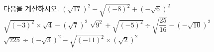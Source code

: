 다음을 계산하시오.
 $(\sqrt{17})^2-\sqrt{(-8)^2}+(-\sqrt{6})^2$
 $\sqrt{(-3)^2}\times\sqrt{4}-(\sqrt{7})^2$
 $\sqrt{9^2}+\sqrt{(-5)^2}\div\sqrt{\dfrac{25}{16}}-(-\sqrt{10})^2$
 $\sqrt{225}\div(-\sqrt{3})^2-\sqrt{(-11)^2}\times(\sqrt{2})^2$
